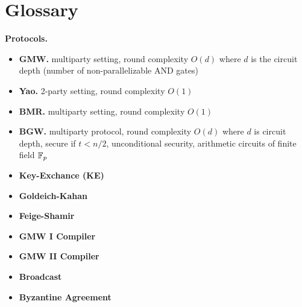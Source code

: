 \section{Glossary}

\textbf{Protocols.} \noindent
\begin{itemize}

\item \textbf{GMW.}
multiparty setting,
round complexity $O(d)$ where $d$ is the circuit depth (number of non-parallelizable AND gates)

\item \textbf{Yao.}
2-party setting,
round complexity $O(1)$

\item \textbf{BMR.}
multiparty setting,
round complexity $O(1)$

\item \textbf{BGW.}
multiparty protocol,
round complexity $O(d)$ where $d$ is circuit depth,
secure if $t < n/2$,
unconditional security,
arithmetic circuits of finite field $\mathbb{F}_p$

\item \textbf{Key-Exchance (KE)}
\item \textbf{Goldeich-Kahan}
\item \textbf{Feige-Shamir}

\item \textbf{GMW I Compiler}
\item \textbf{GMW II Compiler}

\item \textbf{Broadcast}
\item \textbf{Byzantine Agreement}

\end{itemize}